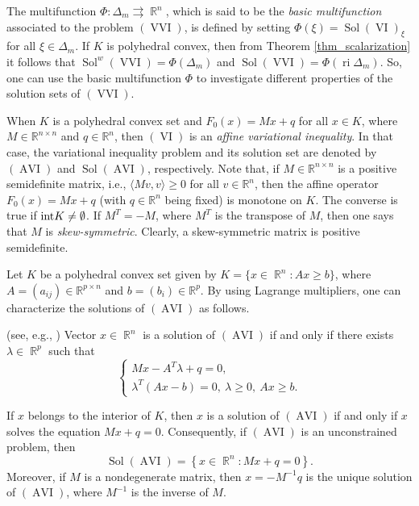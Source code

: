 \documentclass[smallextended,envcountsect]{svjour3}       %
\DeclareMathOperator{\Sol}{Sol}
\DeclareMathOperator{\AVI}{AVI}
\DeclareMathOperator{\VI}{VI}
\DeclareMathOperator{\ri}{ri}
\DeclareMathOperator{\R}{\mathbb{R}}
\DeclareMathOperator{\VVI}{VVI}
\begin{document}
The multifunction $\Phi:\Delta_m \rightrightarrows \R^n$, which is said to be the
\textit{basic multifunction} associated to the problem $(\VVI)$, is defined by setting
$\Phi(\xi)=	\Sol(\VI)_{\xi}$ for all $\xi\in\Delta_m$. If $K$ is polyhedral convex, then from Theorem \ref{thm_scalarization} it follows that $\Sol^{w}(\VVI)=\Phi(\Delta_m)$ and $\Sol(\VVI)=\Phi(\ri\Delta_m)$. So, one can use the basic multifunction $\Phi$ to investigate different properties of the solution sets of $(\VVI)$. 

When $K$ is a polyhedral convex set and $F_0(x)=Mx+q$ for all $x\in K$,
where $M\in\mathbb R^{n\times n}$ and
$q\in\mathbb R^n$, then $(\VI)$ is an {\it affine variational inequality}. In that case, the variational inequality problem and its solution set are denoted by
$(\AVI)$ and $\Sol(\AVI)$, respectively.
Note that, if $M\in\mathbb R^{n\times n}$
is a positive semidefinite matrix, i.e., $\langle Mv,v\rangle\geq 0$
for all $v\in\mathbb R^n$, then the affine operator $F_0(x)=Mx+q$
(with $q\in\mathbb R^n$ being fixed) is monotone on $K$. The
converse is true if ${\rm int}K\neq\emptyset$. If $M^T=-M$, where $M^T$ is the transpose of $M$, then one says that $M$ is \textit{skew-symmetric}. Clearly, a skew-symmetric matrix is positive semidefinite.  

Let $K$ be a polyhedral convex set given by $K=\{x\in \R^n:Ax\geq b\}$, where  $A=(a_{ij})\in {\mathbb R}^{p\times n}$ and $b=(b_i)\in {\mathbb R}^p$. By using Lagrange multipliers, one can characterize the solutions of $(\AVI)$ as follows. 

\begin{theorem}{\rm (see, e.g., \cite[Theorem~5.3]{LTY2005})}\label{Lagrange multipliers rule} Vector $x\in \R^n$ is a solution of $(\AVI)$  if and only if there exists $\lambda\in \R^p$ such that
	\begin{equation}\label{system}
\left\lbrace 	
	\begin{array}{l}	Mx-A^T\lambda+q =0, \\ 
	\lambda^T(Ax-b)=0, \ \lambda \geq 0 , \ Ax \geq b. 	\end{array}\right. 
	\end{equation}
\end{theorem}
\begin{remark}\label{remark_intK} If $x$ belongs to the interior of $K$, then $x$ is a solution of $(\AVI)$ if and only if $x$ solves the equation $Mx+q=0$. Consequently, if $(\AVI)$ is an unconstrained problem, then $$\Sol(\AVI)=\left\lbrace x\in \R^n: Mx+q=0\right\rbrace .$$
Moreover, if $M$ is a nondegenerate matrix, then $x=-M^{-1}q$ is the unique solution of $(\AVI)$, where $M^{-1}$ is the inverse of $M$.
\end{remark}
\end{document}
